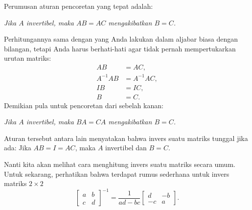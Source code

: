 Perumusan aturan pencoretan yang tepat adalah:
\begin{center}
\emph{Jika $A$ invertibel,
maka
$AB = AC$ mengakibatkan $B=C$.}
\end{center}
Perhitungannya sama dengan yang Anda lakukan dalam aljabar biasa dengan bilangan,
tetapi Anda harus
berhati-hati agar tidak pernah mempertukarkan urutan matriks:
\begin{align*}
AB & = AC , \\
A^{-1}AB & = A^{-1}AC , \\
IB & = IC , \\
B & = C .
\end{align*}
Demikian pula untuk pencoretan dari sebelah kanan:
\begin{center}
\emph{Jika $A$ invertibel,
maka $BA = CA$ mengakibatkan $B=C$.}
\end{center}
Aturan tersebut antara lain menyatakan bahwa
invers suatu matriks tunggal jika ada: Jika $AB = I = AC$, maka $A$
invertibel dan $B=C$.

Nanti kita akan melihat cara menghitung invers suatu matriks
secara umum. Untuk sekarang,
perhatikan bahwa terdapat rumus sederhana untuk invers
matriks $2 \times 2$
\begin{equation*}
\begin{bmatrix}
a & b \\
c & d
\end{bmatrix}^{-1}
=
\frac{1}{ad-bc}
\begin{bmatrix}
d & -b \\
-c & a
\end{bmatrix} .
\end{equation*}

